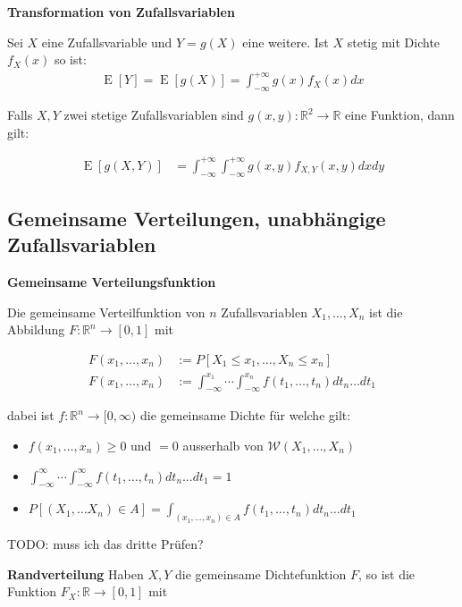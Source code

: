 \documentclass[25pt]{sciposter}
\newcommand{\R}{\mathbb{R}}
\newcommand{\W}{\mathcal{W}}
\newcommand{\E}{\operatorname{E}}
\newenvironment{method}[1]{\begin{mdframed}[backgroundcolor=blue!10,innertopmargin=15pt, innerbottommargin=15pt,nobreak=true]
		\textbf{#1 }
	}
	{ 
	\end{mdframed}
}
\newenvironment{thm}[1]{\begin{mdframed}[backgroundcolor=pink!50,innertopmargin=15pt, innerbottommargin=15pt, nobreak=true]
		\textbf{#1 }
	}
	{ 
	\end{mdframed}
}
\begin{document}
\begin{multicols}{3}
\begin{thm}{Transformation von Zufallsvariablen}
	Sei $X$ eine Zufallsvariable und $Y=g(X)$ eine weitere. Ist $X$ stetig mit Dichte $f_X(x)$ so ist:
	\begin{align*}
		\E[Y] = \E[g(X)] = \int_{-\infty}^{+\infty} g(x) f_X(x) dx
	\end{align*}
	
	Falls $X,Y$ zwei stetige Zufallsvariablen sind $g(x,y) : \R^2 \to \R$ eine Funktion, dann gilt:
	
	\begin{align*}
		\E[g(X,Y)] &= \int_{-\infty}^{+\infty} \int_{-\infty}^{+\infty} g(x,y) f_{X,Y}(x,y) dx dy
	\end{align*}
	
\end{thm}



\subsection*{Gemeinsame Verteilungen, unabhängige Zufallsvariablen}


\begin{method}{Gemeinsame Verteilungsfunktion}
	Die gemeinsame Verteilfunktion von $n$ Zufallsvariablen $X_1,\ldots, X_n$ ist die Abbildung $F:\R^n \to [0,1]$ mit
	
	\begin{align*}
		F(x_1,\ldots,x_n) &:= P[X_1 \leq x_1, \ldots , X_n \leq x_n]\\
		F(x_1,\ldots,x_n) &:= \int_{-\infty}^{x_1}\cdots \int_{-\infty}^{x_n}f(t_1,\ldots,t_n)dt_n\ldots dt_1
	\end{align*}
	
	dabei ist $f:\R^n \to [0,\infty)$ die gemeinsame Dichte für welche gilt:
	\begin{itemize}
		\item $f(x_1,\ldots,x_n)\geq 0$ und $=0$ ausserhalb von $\W(X_1,\ldots,X_n)$
		\item $\int_{-\infty}^{\infty}\cdots \int_{-\infty}^{\infty}f(t_1,\ldots,t_n)dt_n\ldots dt_1 = 1$
		\item $P[(X_1,\ldots X_n)\in A] = \int_{(x_1,\ldots,x_n)\in A}f(t_1,\ldots,t_n)dt_n\ldots dt_1$
	\end{itemize} 
TODO: muss ich das dritte Prüfen?
\end{method}

\begin{method}{Randverteilung} Haben $X,Y$ die gemeinsame Dichtefunktion $F$, so ist die Funktion $F_X : \R \to [0,1]$ mit 
	

\end{method}
\end{multicols}
\end{document}
